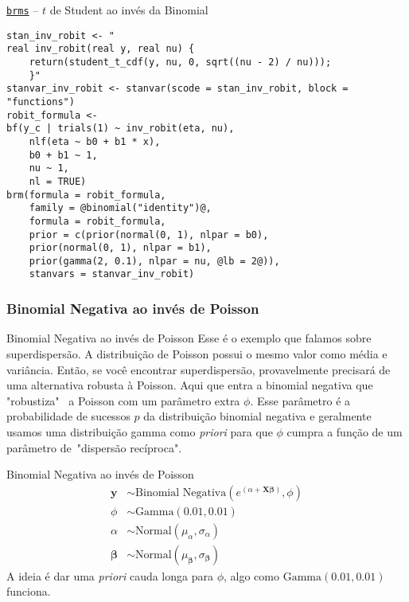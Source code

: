 \begin{frame}[fragile]{\href{https://paul-buerkner.github.io/brms/}{\texttt{brms}} -- $t$ de Student ao invés da Binomial}
	\begin{lstlisting}[basicstyle=\footnotesize]
stan_inv_robit <- "
real inv_robit(real y, real nu) {
    return(student_t_cdf(y, nu, 0, sqrt((nu - 2) / nu)));
    }"
stanvar_inv_robit <- stanvar(scode = stan_inv_robit, block = "functions")
robit_formula <-
bf(y_c | trials(1) ~ inv_robit(eta, nu),
    nlf(eta ~ b0 + b1 * x),
    b0 + b1 ~ 1,
    nu ~ 1,
    nl = TRUE)
brm(formula = robit_formula,
    family = @binomial("identity")@,
    formula = robit_formula,
    prior = c(prior(normal(0, 1), nlpar = b0),
    prior(normal(0, 1), nlpar = b1),
    prior(gamma(2, 0.1), nlpar = nu, @lb = 2@)),
    stanvars = stanvar_inv_robit)
    \end{lstlisting}
\end{frame}

\subsubsection{Binomial Negativa ao invés de Poisson}
\begin{frame}{Binomial Negativa ao invés de Poisson}
	Esse é o exemplo que falamos sobre superdispersão.
	A distribuição de Poisson possui o mesmo valor como média e variância.
	\vfill
	Então, se você encontrar superdispersão, provavelmente precisará de uma alternativa
	robusta à Poisson. Aqui que entra a binomial negativa que "robustiza"~
	a Poisson com um parâmetro extra $\phi$.
	\vfill
	Esse parâmetro é a probabilidade de sucessos $p$ da distribuição binomial negativa
	e geralmente usamos uma distribuição gamma como \textit{priori} para que $\phi$
	cumpra a função de um parâmetro de~"dispersão recíproca".
\end{frame}

\begin{frame}{Binomial Negativa ao invés de Poisson}
	$$
		\begin{aligned}
			\boldsymbol{y}     & \sim \text{Binomial Negativa} \left( e^{(\alpha + \mathbf{X} \boldsymbol{\beta})}, \phi \right) \\
			\phi               & \sim \text{Gamma}(0.01, 0.01)                                                                   \\
			\alpha             & \sim \text{Normal}(\mu_\alpha, \sigma_\alpha)                                                   \\
			\boldsymbol{\beta} & \sim \text{Normal}(\mu_{\boldsymbol{\beta}}, \sigma_{\boldsymbol{\beta}})
		\end{aligned}
	$$
	A ideia é dar uma \textit{priori} cauda longa para $\phi$, algo como
	$\text{Gamma}(0.01, 0.01)$ funciona.
\end{frame}

